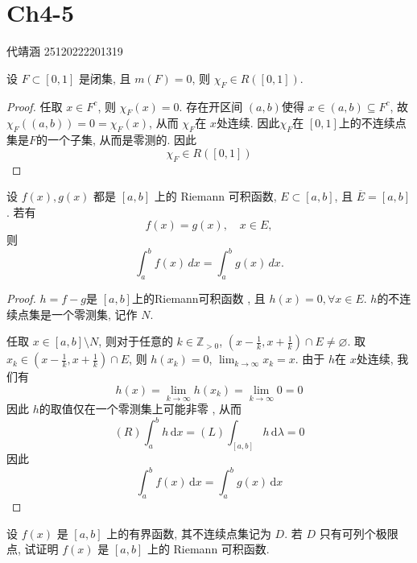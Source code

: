 \documentclass[../main.tex]{subfiles}
\begin{document}
\ifSubfilesClassLoaded{

    
    \setcounter{chapter}{3}
}{}

\chapter{ Ch4-5 }
 代靖涵 25120222201319
\begin{exercise}{}{}
设 \(F \subset [0,1]\) 是闭集, 且 \(m(F)=0\), 则 \(\chi_{F} \in R([0,1])\).
\end{exercise}
\begin{proof}
    任取 \(  x\in F^{c}  \), 则 \(  \chi _{F}\left( x \right)= 0   \). 存在开区间 \(  \left( a,b \right)   \)使得 \(  x\in \left( a,b \right)\subseteq F^{c}   \), 故 \(  \chi _{F}\left( \left( a,b \right)  \right)= 0= \chi _{F}\left( x \right)    \), 从而 \(  \chi _{F}  \)在 \(  x  \)处连续. 因此\(  \chi _{F}  \)在 \(  \left[ 0,1 \right]   \)上的不连续点集是\(  F  \)的一个子集, 从而是零测的. 因此 \[
    \chi _{F}\in R\left( \left[ 0,1 \right]  \right) 
    \]     
\end{proof}
\begin{exercise}{}{}
    设 \(f(x),g(x)\) 都是 \([a,b]\) 上的 Riemann 可积函数, \(E \subset [a,b]\), 且 \(\overline{E} = [a,b]\). 若有
\[
f(x) = g(x),\quad x \in E,
\]
则
\[
\int_a^b f(x)\,dx = \int_a^b g(x)\,dx.
\]
\end{exercise}

\begin{proof}
    \(h=   f-g  \)是 \(  [a,b]  \)上的Riemann可积函数  , 且 \( h\left( x \right) = 0 , \forall x\in E \). \(  h  \)的不连续点集是一个零测集, 记作 \(  N  \). 
    
    任取 \(  x \in [a,b]\setminus N  \), 则对于任意的 \(   k\in \mathbb{Z} _{> 0} \), \(  \left( x-\frac{1 }{k }  ,x+  \frac{1 }{k }  \right)\cap E\neq \varnothing   \). 取 \(  x_{ k }\in \left( x- \frac{1 }{k }  ,x+ \frac{1 }{k }   \right) \cap E  \),  则 \(  h\left( x_{ k } \right)= 0   \),  \(  \lim_{k\to \infty}x_{k}= x  \).  由于 \(  h  \)在 \(  x  \)处连续, 我们有 \[
    h\left( x \right)= \lim_{k\to \infty}h\left( x_{k} \right)= \lim_{k\to \infty}0= 0 
    \]       因此 \(  h  \)的取值仅在一个零测集上可能非零 , 从而 \[
   \left( R \right)\int_{a}^{b}h\,\mathrm{d} x=   \left( L \right)\int_{[a,b]}h\,\mathrm{d}  \lambda = 0 
    \]因此 \[
    \int_{a}^{b}f\left( x \right)\,\mathrm{d} x= \int_{a}^{b}g\left( x \right)\,\mathrm{d} x  
    \]
\end{proof}
\begin{exercise}{}{}
设 $f(x)$ 是 $[a,b]$ 上的有界函数, 其不连续点集记为 $D$. 若 $D$ 只有可列个极限点, 试证明 $f(x)$ 是 $[a,b]$ 上的 Riemann 可积函数.
\end{exercise}
\end{document}
